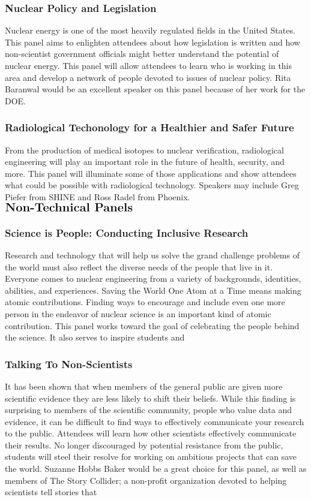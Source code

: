 \subsubsection{Nuclear Policy and Legislation}
Nuclear energy is one of the most heavily regulated fields in the United States. This panel aims to enlighten attendees about how legislation is written and how non-scientist government officials might better understand the potential of nuclear energy. This panel will allow attendees to learn who is working in this area and develop a network of people devoted to issues of nuclear policy.
Rita Baranwal would be an excellent speaker on this panel because of her work for the DOE.

\subsubsection{Radiological Techonology for a Healthier and Safer Future}
From the production of medical isotopes to nuclear verification, radiological engineering will play an important role in the future of health, security, and more. This panel will illuminate some of those applications and show attendees what could be possible with radiological technology. Speakers may include Greg Piefer from SHINE and Ross Radel from Phoenix.\\

$\Large\textbf{Non-Technical Panels}$

\subsubsection{Science is People: Conducting Inclusive Research}
Research and technology that will help us solve the grand challenge problems of the world must also reflect the diverse needs of the people that live in it. Everyone comes to nuclear engineering from a variety of backgrounds, identities, abilities, and experiences. Saving the World One Atom at a Time means making atomic contributions. Finding ways to encourage and include even one more person in the endeavor of nuclear science is an important kind of atomic contribution. This panel works toward the goal of celebrating the people behind the science. It also serves to inspire students and 

\subsubsection{Talking To Non-Scientists}
It has been shown that when members of the general public are given more scientific evidence they are less likely to shift their beliefs. While this finding is surprising to members of the scientific community, people who value data and evidence, it can be difficult to find ways to effectively communicate your research to the public. Attendees will learn how other scientists effectively communicate their results. No longer discouraged by potential resistance from the public, students will steel their resolve for working on ambitious projects that can save the world. Suzanne Hobbs Baker would be a great choice for this panel, as well as members of The Story Collider; a non-profit organization devoted to helping scientists tell stories that 


